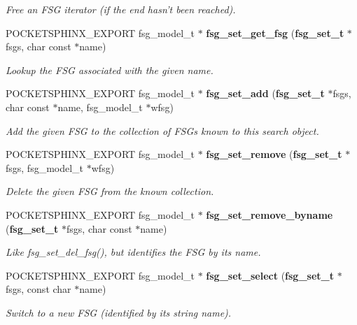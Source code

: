 \begin{DoxyCompactItemize}
\begin{DoxyCompactList}\small\item\em Free an F\-S\-G iterator (if the end hasn't been reached). \end{DoxyCompactList}\item 
P\-O\-C\-K\-E\-T\-S\-P\-H\-I\-N\-X\-\_\-\-E\-X\-P\-O\-R\-T fsg\-\_\-model\-\_\-t $\ast$ {\bf fsg\-\_\-set\-\_\-get\-\_\-fsg} ({\bf fsg\-\_\-set\-\_\-t} $\ast$fsgs, char const $\ast$name)
\begin{DoxyCompactList}\small\item\em Lookup the F\-S\-G associated with the given name. \end{DoxyCompactList}\item 
P\-O\-C\-K\-E\-T\-S\-P\-H\-I\-N\-X\-\_\-\-E\-X\-P\-O\-R\-T fsg\-\_\-model\-\_\-t $\ast$ {\bf fsg\-\_\-set\-\_\-add} ({\bf fsg\-\_\-set\-\_\-t} $\ast$fsgs, char const $\ast$name, fsg\-\_\-model\-\_\-t $\ast$wfsg)
\begin{DoxyCompactList}\small\item\em Add the given F\-S\-G to the collection of F\-S\-Gs known to this search object. \end{DoxyCompactList}\item 
P\-O\-C\-K\-E\-T\-S\-P\-H\-I\-N\-X\-\_\-\-E\-X\-P\-O\-R\-T fsg\-\_\-model\-\_\-t $\ast$ {\bf fsg\-\_\-set\-\_\-remove} ({\bf fsg\-\_\-set\-\_\-t} $\ast$fsgs, fsg\-\_\-model\-\_\-t $\ast$wfsg)\label{fsg__set_8h_ac46a51a7d298277e978821bb61236062}

\begin{DoxyCompactList}\small\item\em Delete the given F\-S\-G from the known collection. \end{DoxyCompactList}\item 
P\-O\-C\-K\-E\-T\-S\-P\-H\-I\-N\-X\-\_\-\-E\-X\-P\-O\-R\-T fsg\-\_\-model\-\_\-t $\ast$ {\bf fsg\-\_\-set\-\_\-remove\-\_\-byname} ({\bf fsg\-\_\-set\-\_\-t} $\ast$fsgs, char const $\ast$name)\label{fsg__set_8h_a48e53ea0b48930ab48a445240162746d}

\begin{DoxyCompactList}\small\item\em Like fsg\-\_\-set\-\_\-del\-\_\-fsg(), but identifies the F\-S\-G by its name. \end{DoxyCompactList}\item 
P\-O\-C\-K\-E\-T\-S\-P\-H\-I\-N\-X\-\_\-\-E\-X\-P\-O\-R\-T fsg\-\_\-model\-\_\-t $\ast$ {\bf fsg\-\_\-set\-\_\-select} ({\bf fsg\-\_\-set\-\_\-t} $\ast$fsgs, const char $\ast$name)
\begin{DoxyCompactList}\small\item\em Switch to a new F\-S\-G (identified by its string name). \end{DoxyCompactList}\end{DoxyCompactItemize}


